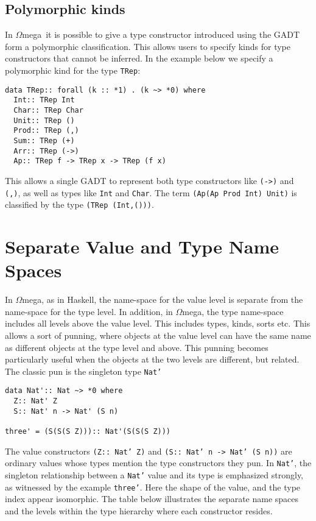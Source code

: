 \documentclass[11pt,twoside]{article}
\newcommand{\om}{$\Omega$mega}
\begin{document}
\subsection{Polymorphic kinds}
In \om\ it is possible to give a type constructor
introduced using the GADT form a polymorphic classification.
This allows users to specify kinds
for type constructors that cannot be inferred. In the example
below we specify a polymorphic kind for the type {\tt TRep}:
\begin{verbatim} 
data TRep:: forall (k :: *1) . (k ~> *0) where
  Int:: TRep Int   
  Char:: TRep Char
  Unit:: TRep ()
  Prod:: TRep (,)
  Sum:: TRep (+)
  Arr:: TRep (->) 
  Ap:: TRep f -> TRep x -> TRep (f x)
\end{verbatim}    
This allows a single GADT to represent both type constructors like
\verb+(->)+ and \verb+(,)+, as well as types like \verb+Int+ and \verb+Char+.
The term \verb+(Ap(Ap Prod Int) Unit)+ is classified
by the type \verb+(TRep (Int,()))+.

\section{Separate Value and Type Name Spaces}

In \om, as in Haskell, the name-space for the value level is separate from the
name-space for the type level.  In addition, in \om, the type name-space
includes all levels above the value level. This includes types, kinds, sorts
etc. This allows a sort of punning, where objects at the value level can have
the same name as different objects at the type level and above. This punning
becomes particularly useful when the objects at the two levels are different,
but related. The classic pun is the singleton type {\tt Nat'}

\begin{verbatim}
data Nat':: Nat ~> *0 where
  Z:: Nat' Z
  S:: Nat' n -> Nat' (S n)
  
three' = (S(S(S Z))):: Nat'(S(S(S Z)))
\end{verbatim}

The value constructors {\tt (Z:: Nat' Z)} and {\tt (S:: Nat' n ->
Nat' (S n))} are ordinary values whose types mention the type
constructors they pun. In {\tt Nat'}, the singleton relationship
between a {\tt Nat'} value and its type is emphasized 
strongly, as witnessed by the example {\tt three'}. Here the
shape of the value, and the type index appear isomorphic. The table
below illustrates the separate name spaces and the levels within the type
hierarchy where each constructor resides.
\end{document}
